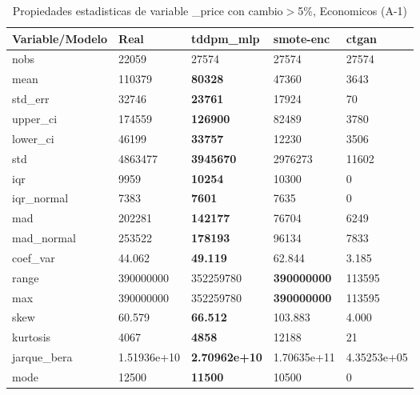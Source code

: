 \begin{table}[H]
\centering
\fontsize{8}{14}\selectfont
\caption{Propiedades estadisticas de variable \_price con cambio\ensuremath{>}5\%, Economicos (A-1)}
\label{table-stats-economicos-a-1-_price-short}
\begin{tabular}{|l|m{10em}|m{10em}|m{10em}|m{10em}|}
\hline
 \rowcolor[gray]{0.8}
Variable/Modelo & Real & tddpm\_mlp & smote-enc & ctgan \\
\hline nobs & 22059 & 27574 & 27574 & 27574 \\
\hline mean & 110379 & \bfseries 80328 & 47360 & \cellcolor[rgb]{0.9, 0.54, 0.52} 3643 \\
\hline std\_err & 32746 & \bfseries 23761 & 17924 & \cellcolor[rgb]{0.9, 0.54, 0.52} 70 \\
\hline upper\_ci & 174559 & \bfseries 126900 & 82489 & \cellcolor[rgb]{0.9, 0.54, 0.52} 3780 \\
\hline lower\_ci & 46199 & \bfseries 33757 & 12230 & \cellcolor[rgb]{0.9, 0.54, 0.52} 3506 \\
\hline std & 4863477 & \bfseries 3945670 & 2976273 & \cellcolor[rgb]{0.9, 0.54, 0.52} 11602 \\
\hline iqr & 9959 & \bfseries 10254 & 10300 & \cellcolor[rgb]{0.9, 0.54, 0.52} 0 \\
\hline iqr\_normal & 7383 & \bfseries 7601 & 7635 & \cellcolor[rgb]{0.9, 0.54, 0.52} 0 \\
\hline mad & 202281 & \bfseries 142177 & 76704 & \cellcolor[rgb]{0.9, 0.54, 0.52} 6249 \\
\hline mad\_normal & 253522 & \bfseries 178193 & 96134 & \cellcolor[rgb]{0.9, 0.54, 0.52} 7833 \\
\hline coef\_var & 44.062 & \bfseries 49.119 & 62.844 & \cellcolor[rgb]{0.9, 0.54, 0.52} 3.185 \\
\hline range & 390000000 & 352259780 & \bfseries 390000000 & \cellcolor[rgb]{0.9, 0.54, 0.52} 113595 \\
\hline max & 390000000 & 352259780 & \bfseries 390000000 & \cellcolor[rgb]{0.9, 0.54, 0.52} 113595 \\
\hline skew & 60.579 & \bfseries 66.512 & 103.883 & \cellcolor[rgb]{0.9, 0.54, 0.52} 4.000 \\
\hline kurtosis & 4067 & \bfseries 4858 & \cellcolor[rgb]{0.9, 0.54, 0.52} 12188 & 21 \\
\hline jarque\_bera & 1.51936e+10 & \bfseries 2.70962e+10 & \cellcolor[rgb]{0.9, 0.54, 0.52} 1.70635e+11 & 4.35253e+05 \\
\hline mode & 12500 & \bfseries 11500 & 10500 & \cellcolor[rgb]{0.9, 0.54, 0.52} 0 \\

\end{tabular}
\end{table}
